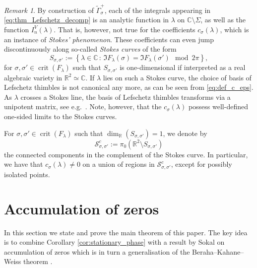 \documentclass[11pt, a4paper]{article}
\numberwithin{theorem}{section}
\theoremstyle{remark}
\newtheorem{remark}[theorem]{Remark}
\newcommand{\RR}{\mathbb{R}}
\newcommand{\CC}{\mathbb{C}}
\DeclareMathOperator{\crit}{crit}
\newcommand{\cS}{\mathcal{S}}
\renewcommand{\Im}{\mathfrak{I}}
\theoremstyle{theorem}
\begin{document}
\begin{remark}
  \label{rem:Stokes}
  By construction of $\widetilde{\Gamma}^+_\sigma$, each of the integrals appearing in \eqref{eq:thm_Lefschetz_decomp} is an analytic function in $\lambda$ on $\CC\setminus\Sigma$, as well as the function $I^V_n(\lambda)$. That is, however, not true for the coefficients $c_\sigma(\lambda)$, which is an instance of \emph{Stokes' phenomenon}. These coefficients can even jump discontinuously along so-called \emph{Stokes curves} of the form 
  \[
    S_{\sigma,\sigma'} := \left\{ \lambda \in \CC \,:\, \Im F_\lambda(\sigma) = \Im F_\lambda(\sigma')\mod 2\pi \right\},
  \] 
  for $\sigma, \sigma'\in \crit(F_{\lambda})$ such that $S_{\sigma,\sigma'}$ is one-dimensional if interpreted as a real algebraic variety in $\RR^2 \simeq \CC$. If $\lambda$ lies on such a Stokes curve, the choice of basis of Lefschetz thimbles is not canonical any more, as can be seen from \eqref{eq:def_c_eps}. As $\lambda$ crosses a Stokes line, the basis of Lefschetz thimbles transforms via a unipotent matrix, see e.g.\ \cite{pham1985descente}. Note, however, that the $c_\sigma(\lambda)$ possess well-defined one-sided limits to the Stokes curves.\par

  For $\sigma,\sigma'\in\crit(F_\lambda)$ such that $\dim_{\RR}(S_{\sigma,\sigma'}) = 1$, we denote by 
  \[
    \cS^c_{\sigma,\sigma'} := \pi_0 \left( \RR^2 \setminus S_{\sigma,\sigma'} \right)
  \]
  the connected components in the complement of the Stokes curve. In particular, we have that $c_\sigma(\lambda) \neq 0$ on a union of regions in $\cS^c_{\sigma,\sigma'}$, except for possibly isolated points.
\end{remark}


\section{Accumulation of zeros}
\label{sec:accumulation}

In this section we state and prove the main theorem of this paper. The key idea is to combine Corollary \ref{cor:stationary_phase} with a result by Sokal on accumulation of zeros which is in turn a generalisation of the Beraha--Kahane--Weiss theorem \cite{beraha1978limits}. \par
\end{document}
